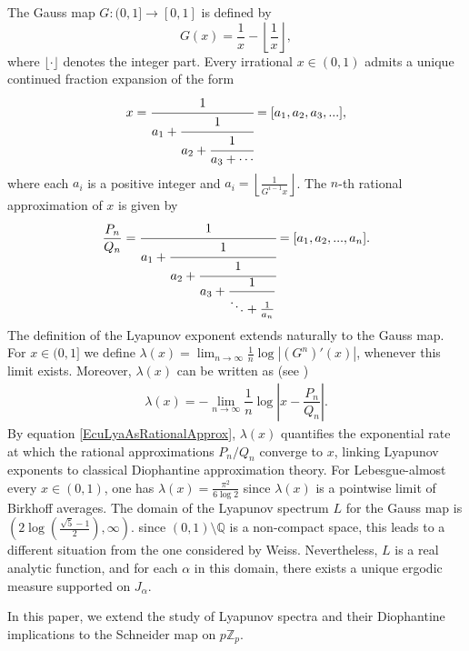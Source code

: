 \documentclass[11pt]{amsart}
\theoremstyle{remark}
\numberwithin{equation}{section}
\newcommand{\Zp}{\mathbb{Z}_p}
\begin{document}
The Gauss map $G: (0,1]\rightarrow [0,1]$ is defined by $$G(x)=\dfrac{1}{x}-\left\lfloor \dfrac{1}{x}\right\rfloor,$$ where $\lfloor \cdot \rfloor$ denotes the integer part.
Every irrational $x\in (0,1)$ admits a unique continued fraction expansion  of the form
  \begin{align}\label{continued}
      x= \cfrac{1}{a_{1}+\cfrac{1}{a_{2}+\cfrac{1}{a_{3}+\cdots }}}=[a_{1},a_{2},a_{3},...],
  \end{align} where each $a_{i}$ is a positive integer and $a_{i}=\left\lfloor \frac{1}{G^{i-1}x}\right\rfloor$. 
The $n$-th rational approximation of $x$ is given by
  \begin{align*}
      \dfrac{P_n}{Q_{n}}=\cfrac{1}{a_{1}+\cfrac{1}{a_{2}+\cfrac{1}{a_{3}+\dfrac{1}{\ddots +\frac{1}{a_{n}}} }}}=[a_{1},a_{2},...,a_{n}].
  \end{align*} 
The definition of the Lyapunov exponent extends naturally to the Gauss map. For $x\in (0,1]$ we define $\lambda(x)=\lim_{n\to \infty}\frac{1}{n}\log |(G^{n})'(x)|$, whenever this limit exists. Moreover, $\lambda(x)$ can be written as  (see \cite[Page 160]{mh})
  \begin{align}\label{EcuLyaAsRationalApprox}
      \lambda(x)=-\lim_{n\rightarrow \infty}\dfrac{1}{n}\log \left|x-\dfrac{P_{n}}{Q_{n}}\right|.
  \end{align} 
By equation \eqref{EcuLyaAsRationalApprox}, $\lambda(x)$ quantifies the exponential rate at which the rational approximations $P_n/Q_n$ converge to 
$x$, linking Lyapunov exponents to classical Diophantine approximation theory. For Lebesgue-almost every $x\in (0,1)$, one has $\lambda(x)=\frac{\pi^{2}}{6\log 2}$ since $\lambda
(x)$ is a pointwise limit of Birkhoff averages. The domain of the Lyapunov spectrum $L$ for the Gauss map is $\left(2\log\left(\frac{\sqrt{5}-1}{2}\right),\infty\right)$. since $(0,1)\setminus \mathbb{Q}$ is a non-compact space, this leads to a different situation from the one considered by Weiss. Nevertheless, $L$ is a real analytic function, and for each $\alpha$ in this domain, there exists a unique ergodic measure supported on $J_{\alpha}$.

In this paper, we extend the study of Lyapunov spectra and their Diophantine implications to the Schneider map on $p\Zp$. 
\end{document}
